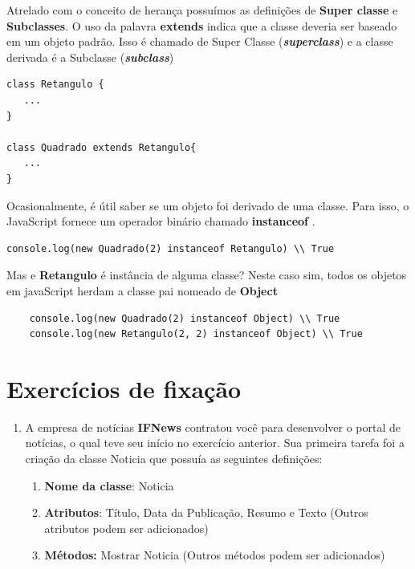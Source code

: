 Atrelado com o conceito de herança possuímos as definições de \textbf{Super classe} e \textbf{Subclasses}.  O uso da palavra \textbf{extends} indica que a classe deveria ser baseado em um objeto padrão. Isso é chamado de Super Classe (\textbf{\textit{superclass}}) e a classe derivada é a Subclasse (\textbf{\textit{subclass}}) \cite{haverbeke2018eloquent}

\begin{verbatim}
class Retangulo {
   ...
}

class Quadrado extends Retangulo{
   ...
}
\end{verbatim}

Ocasionalmente, é útil saber se um objeto foi derivado de uma
classe. Para isso, o JavaScript fornece um operador binário chamado \textbf{instanceof} \cite{haverbeke2018eloquent}. 

\begin{verbatim}
console.log(new Quadrado(2) instanceof Retangulo) \\ True
\end{verbatim}

Mas e \textbf{Retangulo} é instância de alguma classe? Neste caso sim, todos os objetos em javaScript herdam a classe pai nomeado de \textbf{Object}

\begin{verbatim}
	console.log(new Quadrado(2) instanceof Object) \\ True
	console.log(new Retangulo(2, 2) instanceof Object) \\ True
\end{verbatim}

\section{Exercícios de fixação}

\begin{enumerate}
	\item A empresa de notícias \textbf{IFNews} contratou você para desenvolver o portal de notícias, o qual teve seu início no exercício anterior. Sua primeira tarefa foi a criação da classe Noticia que possuía as seguintes definições: 
	
	\begin{enumerate}
		\item \textbf{Nome da classe}: Noticia
		\item \textbf{Atributos}: Título, Data da Publicação, Resumo e Texto (Outros atributos podem ser adicionados)
		\item \textbf{Métodos:} Mostrar Noticia (Outros métodos podem ser adicionados)
	\end{enumerate}
\end{enumerate}

